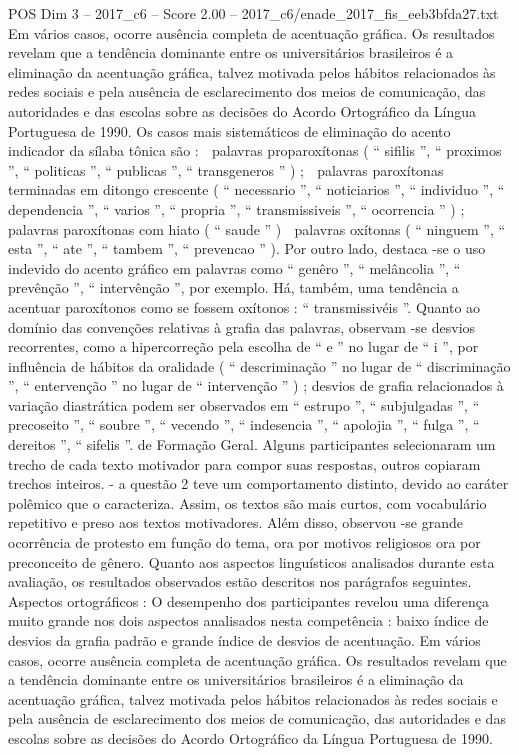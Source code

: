 \begin{textsample}{POS Dim 3 – 2017\_c6 – Score 2.00 – 2017\_c6/enade\_2017\_fis\_eeb3bfda27.txt}
Em vários casos, ocorre ausência completa de acentuação gráfica.
Os resultados revelam que a tendência dominante entre os universitários brasileiros é a eliminação da acentuação gráfica, talvez motivada pelos hábitos relacionados às redes sociais e pela ausência de esclarecimento dos meios de comunicação, das autoridades e das escolas sobre as decisões do Acordo Ortográfico da Língua Portuguesa de 1990.
Os casos mais sistemáticos de eliminação do acento indicador da sílaba tônica são :  palavras proparoxítonas ( “ sifilis ”, “ proximos ”, “ politicas ”, “ publicas ”, “ transgeneros ” ) ;  palavras paroxítonas terminadas em ditongo crescente ( “ necessario ”, “ noticiarios ”, “ individuo ”, “ dependencia ”, “ varios ”, “ propria ”, “ transmissiveis ”, “ ocorrencia ” ) ;  palavras paroxítonas com hiato ( “ saude ” )  palavras oxítonas ( “ ninguem ”, “ esta ”, “ ate ”, “ tambem ”, “ prevencao ” ).
Por outro lado, destaca -se o uso indevido do acento gráfico em palavras como “ genêro ”, “ melâncolia ”, “ prevênção ”, “ intervênção ”, por exemplo.
Há, também, uma tendência a acentuar paroxítonos como se fossem oxítonos : “ transmissivéis ”.
Quanto ao domínio das convenções relativas à grafia das palavras, observam -se desvios recorrentes, como a hipercorreção pela escolha de “ e ” no lugar de “ i ”, por influência de hábitos da oralidade ( “ descriminação ” no lugar de “ discriminação ”, “ entervenção ” no lugar de “ intervenção ” ) ; desvios de grafia relacionados à variação diastrática podem ser observados em “ estrupo ”, “ subjulgadas ”, “ precoseito ”, “ soubre ”, “ vecendo ”, “ indesencia ”, “ apolojia ”, “ fulga ”, “ dereitos ”, “ sifelis ”. de Formação Geral.
Alguns participantes selecionaram um trecho de cada texto motivador para compor suas respostas, outros copiaram trechos inteiros. - a questão 2 teve um comportamento distinto, devido ao caráter polêmico que o caracteriza.
Assim, os textos são mais curtos, com vocabulário repetitivo e preso aos textos motivadores.
Além disso, observou -se grande ocorrência de protesto em função do tema, ora por motivos religiosos ora por preconceito de gênero.
Quanto aos aspectos linguísticos analisados durante esta avaliação, os resultados observados estão descritos nos parágrafos seguintes.
Aspectos ortográficos : O desempenho dos participantes revelou uma diferença muito grande nos dois aspectos analisados nesta competência : baixo índice de desvios da grafia padrão e grande índice de desvios de acentuação.
Em vários casos, ocorre ausência completa de acentuação gráfica.
Os resultados revelam que a tendência dominante entre os universitários brasileiros é a eliminação da acentuação gráfica, talvez motivada pelos hábitos relacionados às redes sociais e pela ausência de esclarecimento dos meios de comunicação, das autoridades e das escolas sobre as decisões do Acordo Ortográfico da Língua Portuguesa de 1990.

\end{textsample}
